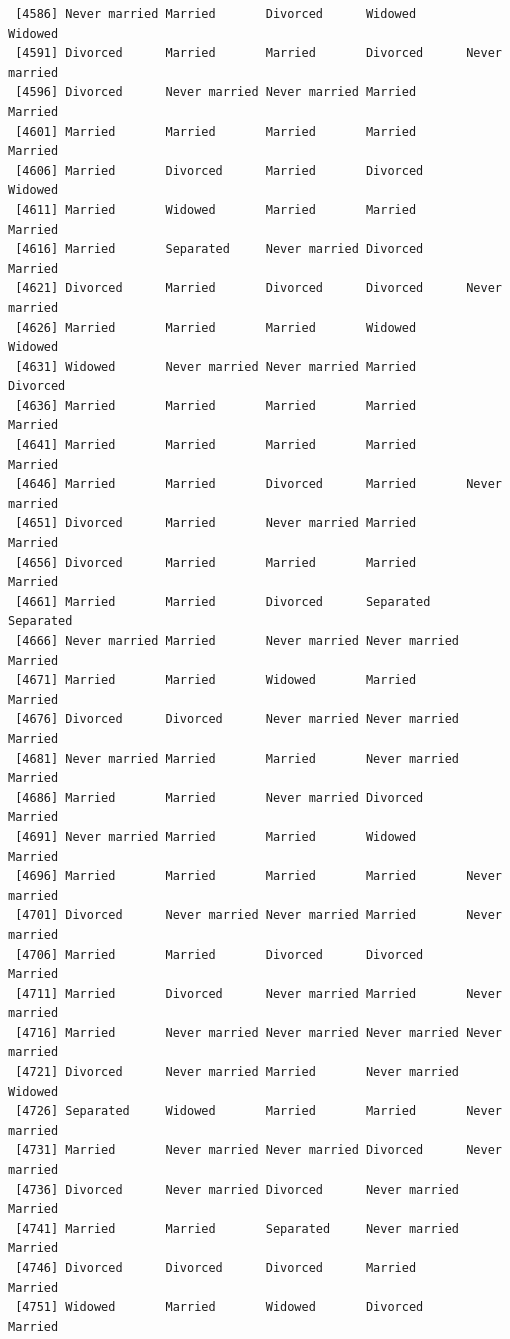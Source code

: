 \documentclass[
  letterpaper,
  DIV=11,
  numbers=noendperiod,
  oneside]{scrartcl}
\begin{document}
\begin{verbatim}
 [4586] Never married Married       Divorced      Widowed       Widowed      
 [4591] Divorced      Married       Married       Divorced      Never married
 [4596] Divorced      Never married Never married Married       Married      
 [4601] Married       Married       Married       Married       Married      
 [4606] Married       Divorced      Married       Divorced      Widowed      
 [4611] Married       Widowed       Married       Married       Married      
 [4616] Married       Separated     Never married Divorced      Married      
 [4621] Divorced      Married       Divorced      Divorced      Never married
 [4626] Married       Married       Married       Widowed       Widowed      
 [4631] Widowed       Never married Never married Married       Divorced     
 [4636] Married       Married       Married       Married       Married      
 [4641] Married       Married       Married       Married       Married      
 [4646] Married       Married       Divorced      Married       Never married
 [4651] Divorced      Married       Never married Married       Married      
 [4656] Divorced      Married       Married       Married       Married      
 [4661] Married       Married       Divorced      Separated     Separated    
 [4666] Never married Married       Never married Never married Married      
 [4671] Married       Married       Widowed       Married       Married      
 [4676] Divorced      Divorced      Never married Never married Married      
 [4681] Never married Married       Married       Never married Married      
 [4686] Married       Married       Never married Divorced      Married      
 [4691] Never married Married       Married       Widowed       Married      
 [4696] Married       Married       Married       Married       Never married
 [4701] Divorced      Never married Never married Married       Never married
 [4706] Married       Married       Divorced      Divorced      Married      
 [4711] Married       Divorced      Never married Married       Never married
 [4716] Married       Never married Never married Never married Never married
 [4721] Divorced      Never married Married       Never married Widowed      
 [4726] Separated     Widowed       Married       Married       Never married
 [4731] Married       Never married Never married Divorced      Never married
 [4736] Divorced      Never married Divorced      Never married Married      
 [4741] Married       Married       Separated     Never married Married      
 [4746] Divorced      Divorced      Divorced      Married       Married      
 [4751] Widowed       Married       Widowed       Divorced      Married      

\end{verbatim}
\end{document}
